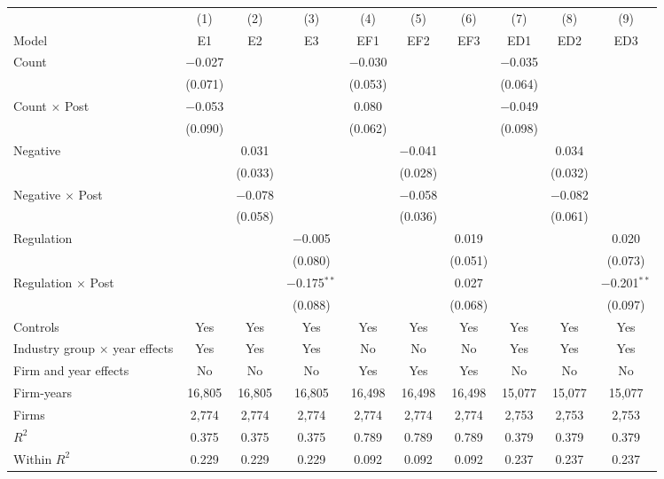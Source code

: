 \begin{tabular}{lccccccccc}
\toprule
 & (1) & (2) & (3) & (4) & (5) & (6) & (7) & (8) & (9) \\
Model & E1 & E2 & E3 & EF1 & EF2 & EF3 & ED1 & ED2 & ED3 \\
\midrule
Count & $-$0.027 &  &  & $-$0.030 &  &  & $-$0.035 &  &  \\
 & (0.071) &  &  & (0.053) &  &  & (0.064) &  &  \\
Count $\times$ Post & $-$0.053 &  &  & 0.080 &  &  & $-$0.049 &  &  \\
 & (0.090) &  &  & (0.062) &  &  & (0.098) &  &  \\
Negative &  & 0.031 &  &  & $-$0.041 &  &  & 0.034 &  \\
 &  & (0.033) &  &  & (0.028) &  &  & (0.032) &  \\
Negative $\times$ Post &  & $-$0.078 &  &  & $-$0.058 &  &  & $-$0.082 &  \\
 &  & (0.058) &  &  & (0.036) &  &  & (0.061) &  \\
Regulation &  &  & $-$0.005 &  &  & 0.019 &  &  & 0.020 \\
 &  &  & (0.080) &  &  & (0.051) &  &  & (0.073) \\
Regulation $\times$ Post &  &  & $-$0.175$^{**}$ &  &  & 0.027 &  &  & $-$0.201$^{**}$ \\
 &  &  & (0.088) &  &  & (0.068) &  &  & (0.097) \\
\midrule
Controls & Yes & Yes & Yes & Yes & Yes & Yes & Yes & Yes & Yes \\
Industry group $\times$ year effects & Yes & Yes & Yes & No & No & No & Yes & Yes & Yes \\
Firm and year effects & No & No & No & Yes & Yes & Yes & No & No & No \\
Firm-years & 16,805 & 16,805 & 16,805 & 16,498 & 16,498 & 16,498 & 15,077 & 15,077 & 15,077 \\
Firms & 2,774 & 2,774 & 2,774 & 2,774 & 2,774 & 2,774 & 2,753 & 2,753 & 2,753 \\
$R^2$ & 0.375 & 0.375 & 0.375 & 0.789 & 0.789 & 0.789 & 0.379 & 0.379 & 0.379 \\
Within $R^2$ & 0.229 & 0.229 & 0.229 & 0.092 & 0.092 & 0.092 & 0.237 & 0.237 & 0.237 \\
\bottomrule
\end{tabular}
